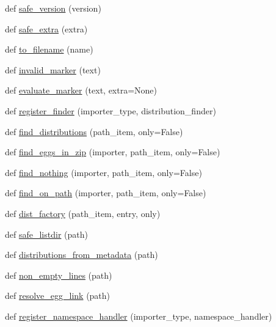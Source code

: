 \begin{DoxyCompactItemize}
\item 
def \hyperlink{namespacepkg__resources_a20ac952ffecf95bf3d88e9a15251ab80}{safe\+\_\+version} (version)
\item 
def \hyperlink{namespacepkg__resources_a60b77b0c5890f9f0087fe9b6055f138f}{safe\+\_\+extra} (extra)
\item 
def \hyperlink{namespacepkg__resources_a6c980c35b437e195d4ab09e4fac70626}{to\+\_\+filename} (name)
\item 
def \hyperlink{namespacepkg__resources_aeb46162da9479c499b4bac06b6ed557a}{invalid\+\_\+marker} (text)
\item 
def \hyperlink{namespacepkg__resources_a02ab4b058591e3461dc3653dc9a0c01d}{evaluate\+\_\+marker} (text, extra=None)
\item 
def \hyperlink{namespacepkg__resources_a64bf2dc95891c62e1b8bdfc0d67c21d5}{register\+\_\+finder} (importer\+\_\+type, distribution\+\_\+finder)
\item 
def \hyperlink{namespacepkg__resources_aeade0feaa17d259fd4a7bfa8f8c7383f}{find\+\_\+distributions} (path\+\_\+item, only=False)
\item 
def \hyperlink{namespacepkg__resources_a36b4f55e7e31b83cee4451daf5966e7f}{find\+\_\+eggs\+\_\+in\+\_\+zip} (importer, path\+\_\+item, only=False)
\item 
def \hyperlink{namespacepkg__resources_a755c41246e3f38059e8705eb3b39cb51}{find\+\_\+nothing} (importer, path\+\_\+item, only=False)
\item 
def \hyperlink{namespacepkg__resources_a27d55e99dedd8d8ac67c7bf8446ca396}{find\+\_\+on\+\_\+path} (importer, path\+\_\+item, only=False)
\item 
def \hyperlink{namespacepkg__resources_a2dd2cfe9de57b827c6747e80e1ef18e2}{dist\+\_\+factory} (path\+\_\+item, entry, only)
\item 
def \hyperlink{namespacepkg__resources_a24a292f7cca8e380c17105cfc9d88955}{safe\+\_\+listdir} (path)
\item 
def \hyperlink{namespacepkg__resources_abbb0c07a5cceabd55690cf052dfbea0d}{distributions\+\_\+from\+\_\+metadata} (path)
\item 
def \hyperlink{namespacepkg__resources_aebf9bba27fbad2388790590cac11be48}{non\+\_\+empty\+\_\+lines} (path)
\item 
def \hyperlink{namespacepkg__resources_a6ae462ea407849fd77ba2ee61c3ba24c}{resolve\+\_\+egg\+\_\+link} (path)
\item 
def \hyperlink{namespacepkg__resources_acfe88771fd78c58a49378665ecc42e10}{register\+\_\+namespace\+\_\+handler} (importer\+\_\+type, namespace\+\_\+handler)

\end{DoxyCompactItemize}
